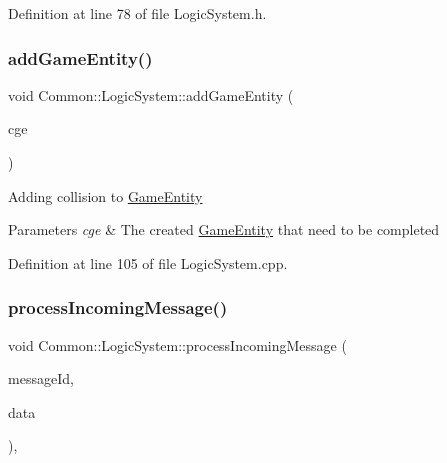 Definition at line 78 of file Logic\+System.\+h.

\mbox{\label{class_common_1_1_logic_system_a8ff1976c824aab7d67481390b5e81a4d}} 
\subsubsection{\texorpdfstring{add\+Game\+Entity()}{addGameEntity()}}
{\footnotesize\ttfamily void Common\+::\+Logic\+System\+::add\+Game\+Entity (\begin{DoxyParamCaption}\item[{const \hyperlink{struct_common_1_1_game_entity_manager_1_1_created_game_entity}{Game\+Entity\+Manager\+::\+Created\+Game\+Entity} $\ast$}]{cge }\end{DoxyParamCaption})}

Adding collision to \hyperlink{struct_common_1_1_game_entity}{Game\+Entity} 
\begin{DoxyParams}{Parameters}
{\em cge} & The created \hyperlink{struct_common_1_1_game_entity}{Game\+Entity} that need to be completed \\
\hline
\end{DoxyParams}


Definition at line 105 of file Logic\+System.\+cpp.

\mbox{\label{class_common_1_1_logic_system_a4495ecadf034103ad58deab6802543fa}} 
\subsubsection{\texorpdfstring{process\+Incoming\+Message()}{processIncomingMessage()}}
{\footnotesize\ttfamily void Common\+::\+Logic\+System\+::process\+Incoming\+Message (\begin{DoxyParamCaption}\item[{\hyperlink{group___common_gaa8c87d2b450282716c906da283e149e6}{Mq\+::\+Message\+Id}}]{message\+Id,  }\item[{const void $\ast$}]{data }\end{DoxyParamCaption})\hspace{0.3cm}{\ttfamily [protected]}, {\ttfamily [virtual]}}

